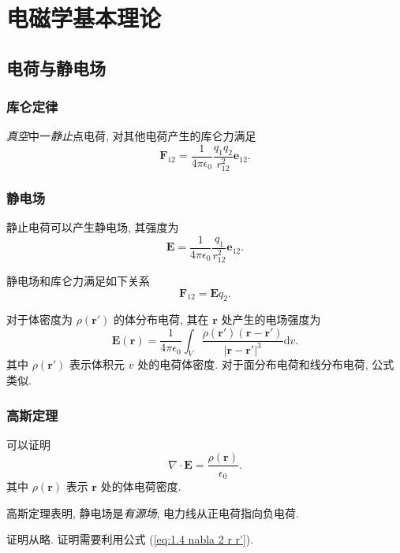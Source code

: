\section{电磁学基本理论}
\subsection{电荷与静电场}
\subsubsection{库仑定律}
\textit{真空}中一\textit{静止}点电荷, 对其他电荷产生的库仑力满足
\begin{equation}
    \bm{F}_{12}=\frac{1}{4\pi\epsilon_0}\frac{q_1q_2}{r_{12}^2}\bm{e}_{12}.
\end{equation}

\subsubsection{静电场}
静止电荷可以产生静电场, 其强度为
\begin{equation}
    \bm{E}=\frac{1}{4\pi\epsilon_0}\frac{q_1}{r_{12}^2}\bm{e}_{12}.
\end{equation}

静电场和库仑力满足如下关系
\begin{equation}
    \bm{F}_{12}=\bm{E}q_2.
\end{equation}

对于体密度为 $\rho(\bm{r'})$ 的体分布电荷, 其在 $\bm{r}$ 处产生的电场强度为
\begin{equation} \label{eq:2.1 E v}
    \bm{E}(\bm{r})=\frac{1}{4\pi\epsilon_0}\int_V\frac{\rho(\bm{r'})(\bm{r}-\bm{r'})}{|\bm{r}-\bm{r'}|^3}\mathrm{d}v.
\end{equation}
其中 $\rho(\bm{r'})$ 表示体积元 $v$ 处的电荷体密度. 对于面分布电荷和线分布电荷, 公式类似.

\subsubsection{高斯定理}
可以证明
\begin{equation}
    \nabla\cdot\bm{E}=\frac{\rho(\bm{r})}{\epsilon_0}.
\end{equation}
其中 $\rho(\bm{r})$ 表示 $\bm{r}$ 处的体电荷密度.

高斯定理表明, 静电场是\textit{有源场}, 电力线从正电荷指向负电荷.

证明从略. 证明需要利用公式 (\ref{eq:1.4 nabla 2 r r'}).

